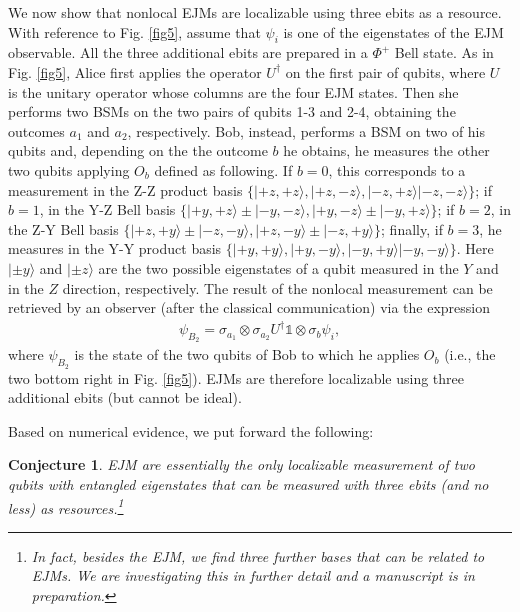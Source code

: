 \documentclass[a4paper,twocolumn,11pt,accepted=2024-02-14]{quantumarticle}
\newcommand{\ket}[1]{| {#1} \rangle} %
\newtheorem{conj}{Conjecture}
\begin{document}
We now show that nonlocal EJMs are localizable using three ebits as a resource. With reference to Fig. \ref{fig5}, assume that $\psi_i$ is one of the eigenstates of the EJM observable. All the three additional ebits are prepared in a $\Phi^+$ Bell state. As in Fig. \ref{fig5}, Alice first applies the operator $U^\dagger$ on the first pair of qubits, where $U$ is the unitary operator whose columns are the four EJM states. Then she performs two BSMs on the two pairs of qubits 1-3 and 2-4, obtaining the outcomes $a_1$ and $a_2$, respectively. Bob, instead, performs a BSM on two of his qubits and, depending on the the outcome $b$ he obtains, he measures the other two qubits applying $O_b$ defined as following. If $b=0$, this corresponds to a measurement in the Z-Z product basis $\{\ket{+z,+z}, \ket{+z,-z}, \ket{-z,+z} \ket{-z, -z}\}$; if $b=1$, in the Y-Z Bell basis $\{\ket{+y,+z}\pm \ket{-y, -z},\ket{+y,-z}   \pm \ket{-y, +z}\}$; if $b=2$, in the Z-Y Bell basis $\{\ket{+z,+y}\pm \ket{-z, -y},\ket{+z,-y}    \pm \ket{-z, +y}\}$; finally, if $b=3$, he measures in the Y-Y product basis $\{\ket{+y,+y}, \ket{+y,-y}, \ket{-y,+y} \ket{-y, -y}\}$. Here $\ket{\pm y}$ and $\ket{\pm z}$ are the two possible eigenstates of a qubit measured in the $Y$ and in the $Z$ direction, respectively.  The result of the nonlocal measurement can be retrieved by an observer (after the classical communication) via the expression
\begin{eqnarray}
\label{ejmstate}
\psi_{B_2}=\sigma_{a_1}\otimes \sigma_{a_2} U^{\dagger}\mathds{1}\otimes\sigma_{b}\psi_i, %
\end{eqnarray}
where $\psi_{B_2}$ is the state of the two qubits of Bob to which he applies $O_b$ (i.e., the two bottom right in Fig. \ref{fig5}). EJMs are therefore localizable using three additional ebits (but cannot be ideal).

Based on numerical evidence, we put forward the following:
\begin{conj}
    EJM are essentially the only localizable measurement of two qubits with entangled eigenstates that can be measured with three ebits (and no less) as resources.\footnote{In fact, besides the EJM, we find three further bases that can be related to EJMs. We are investigating this in further detail and a manuscript is in preparation.}
\end{conj}

\end{document}
